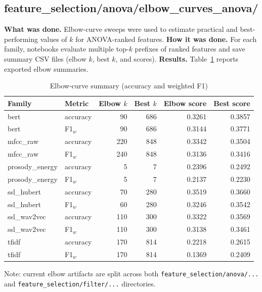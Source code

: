 \subsection{feature\_selection/anova/elbow\_curves\_anova/}
\textbf{What was done.} Elbow-curve sweeps were used to estimate practical and best-performing values of $k$ for ANOVA-ranked features.
\textbf{How it was done.} For each family, notebooks evaluate multiple top-$k$ prefixes of ranked features and save summary CSV files (elbow $k$, best $k$, and scores).
\textbf{Results.} Table~\ref{tab:elbow_results} reports exported elbow summaries.
\begin{table}[h]
\centering
\caption{Elbow-curve summary (accuracy and weighted F1)}
\label{tab:elbow_results}
\begin{tabular}{llrrrr}
\hline
Family & Metric & Elbow $k$ & Best $k$ & Elbow score & Best score \\
\hline
bert & accuracy & 90 & 686 & 0.3261 & 0.3857 \\
bert & F1$_w$ & 90 & 686 & 0.3144 & 0.3771 \\
mfcc\_raw & accuracy & 220 & 848 & 0.3342 & 0.3504 \\
mfcc\_raw & F1$_w$ & 240 & 848 & 0.3136 & 0.3416 \\
prosody\_energy & accuracy & 5 & 7 & 0.2396 & 0.2492 \\
prosody\_energy & F1$_w$ & 5 & 7 & 0.2137 & 0.2230 \\
ssl\_hubert & accuracy & 70 & 280 & 0.3519 & 0.3660 \\
ssl\_hubert & F1$_w$ & 60 & 280 & 0.3246 & 0.3542 \\
ssl\_wav2vec & accuracy & 110 & 300 & 0.3322 & 0.3569 \\
ssl\_wav2vec & F1$_w$ & 110 & 300 & 0.3138 & 0.3461 \\
tfidf & accuracy & 170 & 814 & 0.2218 & 0.2615 \\
tfidf & F1$_w$ & 170 & 814 & 0.1369 & 0.2409 \\
\hline
\end{tabular}
\end{table}
\noindent Note: current elbow artifacts are split across both \texttt{feature\_selection/anova/...} and \texttt{feature\_selection/filter/...} directories.
